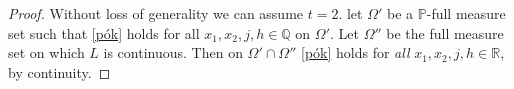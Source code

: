 \documentclass[a4paper]{article}
\begin{document}
\begin{proof} Without loss of generality we can assume $t = 2$. let $\Omega'$ be a $\mathbb{P}$-full measure set such that \eqref{pók} holds for all $x_{1},x_{2},j,h\in\mathbb{Q}$
on $\Omega'$. Let $\Omega''$ be the full measure set on which $L$ is continuous. Then on $\Omega'\cap\Omega''$ \eqref{pók} holds
for \emph{all} $x_{1},x_{2},j,h\in\mathbb{R}$, by continuity.	

\end{proof}
\end{document}
